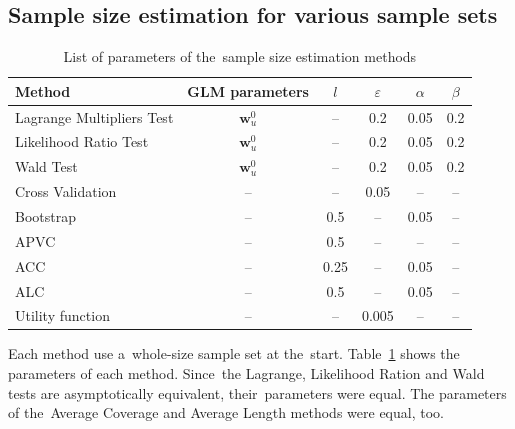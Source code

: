\documentclass[
11pt,%
tightenlines,%
twoside,%
onecolumn,%
nofloats,%
nobibnotes,%
nofootinbib,%
superscriptaddress,%
noshowpacs,%
centertags]%
{revtex4}
\begin{document}
\subsection{Sample size estimation for various sample sets}
\begin{table}[h!]
\begin{center}
\caption{List of parameters of the~sample size estimation methods}
\label{table3}
\begin{tabular}{l|c|c|c|c|c}
\hline
Method& GLM parameters& $l$& $\varepsilon$  & $\alpha$& $\beta$\\
\hline
Lagrange    Multipliers Test    & $\mathbf{w}_{u}^0$    & -- & 0.2& 0.05& 0.2\\
\hline
Likelihood Ratio Test           & $\mathbf{w}_{u}^0$    & -- & 0.2& 0.05& 0.2\\
\hline
Wald    Test                            & $\mathbf{w}_{u}^0$    & -- & 0.2& 0.05& 0.2\\
\hline
Cross Validation                & -- & --   & 0.05& -- & --\\
\hline
Bootstrap                           & -- & 0.5  & -- & 0.05& --\\
\hline
APVC                                    & -- & 0.5  & -- & -- & --\\
\hline
ACC                                     & -- & 0.25 & -- & 0.05& --\\
\hline
ALC                                         & -- & 0.5  & -- & 0.05& --\\
\hline
Utility function                    & -- & --   & 0.005& -- & --\\
\hline
\end{tabular}
\end{center}
\end{table}


Each method use a~whole-size sample set at the~start.
Table~\ref{table3}  shows the parameters of each method. Since~the
Lagrange, Likelihood Ration and Wald tests are asymptotically
equivalent, their~parameters were equal. The parameters of
the~Average Coverage and Average Length methods were equal, too.
\end{document}
